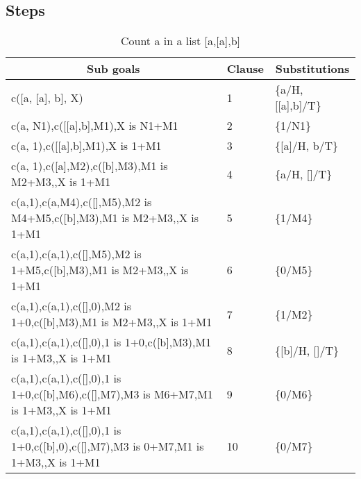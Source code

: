 \documentclass{article}
\begin{document}
\subsection{Steps}
\begin{table}[ht!]
\centering
\caption{Count a in a list [a,[a],b]}
\begin{tabular}{|l|l|l|}
\hline
\multicolumn{1}{|c|}{Sub goals}                                                                 & \multicolumn{1}{c|}{Clause} & \multicolumn{1}{c|}{Substitutions} \\ \hline
c({[}a, {[}a{]}, b{]}, X)                                                                       & 1                           & \{a/H, {[}{[}a{]},b{]}/T\}         \\ \hline
c(a, N1),c({[}{[}a{]},b{]},M1),X is N1+M1                                                       & 2                           & \{1/N1\}                           \\ \hline
c(a, 1),c({[}{[}a{]},b{]},M1),X is 1+M1                                                         & 3                           & \{{[}a{]}/H, b/T\}                 \\ \hline
c(a, 1),c({[}a{]},M2),c({[}b{]},M3),M1 is M2+M3,,X is 1+M1                                      & 4                           & \{a/H, {[}{]}/T\}                  \\ \hline
c(a,1),c(a,M4),c({[}{]},M5),M2 is M4+M5,c({[}b{]},M3),M1 is M2+M3,,X is 1+M1                    & 5                           & \{1/M4\}                           \\ \hline
c(a,1),c(a,1),c({[}{]},M5),M2 is 1+M5,c({[}b{]},M3),M1 is M2+M3,,X is 1+M1                      & 6                           & \{0/M5\}                           \\ \hline
c(a,1),c(a,1),c({[}{]},0),M2 is 1+0,c({[}b{]},M3),M1 is M2+M3,,X is 1+M1                        & 7                           & \{1/M2\}                           \\ \hline
c(a,1),c(a,1),c({[}{]},0),1 is 1+0,c({[}b{]},M3),M1 is 1+M3,,X is 1+M1                          & 8                           & \{{[}b{]}/H, {[}{]}/T\}            \\ \hline
c(a,1),c(a,1),c({[}{]},0),1 is 1+0,c({[}b{]},M6),c({[}{]},M7),M3 is M6+M7,M1 is 1+M3,,X is 1+M1 & 9                           & \{0/M6\}                           \\ \hline
c(a,1),c(a,1),c({[}{]},0),1 is 1+0,c({[}b{]},0),c({[}{]},M7),M3 is 0+M7,M1 is 1+M3,,X is 1+M1   & 10                          & \{0/M7\}                           \\ \hline

\end{tabular}
\end{table}
\end{document}
